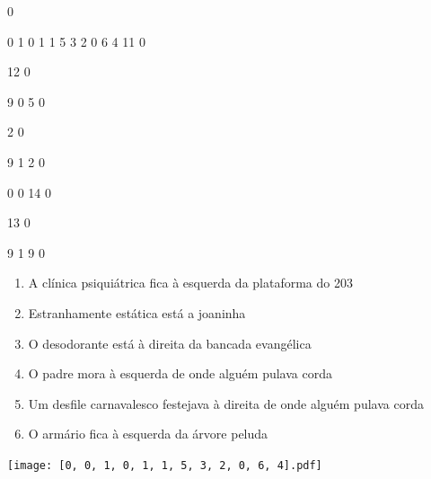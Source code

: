\documentclass[12pt]{article}
\begin{document}
		\vfill  
		  
{
	0	%

	0	%
	1	%
	0	%
	1	%
	1	%
	5	%
	3	%
	2	%
	0	%
	6	%
	4	%
	11	%
	0	%

	12	%
	0	%

	9	%
	0	%
	5	%
	0	%

	2	%
	0	%

	9	%
	1	%
	2	%
	0	%

	0	%
	0	%
	14	%
	0	%

	13	%
	0	%

	9	%
	1	%
	9	%
	0	%
}	  
		    	

		 

\pagebreak


	\begin{enumerate}
		  \sffamily %
		  \large %


\vfill \item
A clínica psiquiátrica fica	%
à esquerda
da plataforma do 203	%

\vfill \item
Estranhamente estática está	%
a joaninha	%

\vfill \item
O desodorante está	%
à direita
da bancada evangélica	%

\vfill \item
O padre mora	%
à esquerda
de onde alguém pulava corda	%

\vfill \item
Um desfile carnavalesco festejava	%
à direita
de onde alguém pulava corda	%

\vfill \item
O armário fica	%
à esquerda
da árvore peluda	%
	\end{enumerate}
		  
		  \hfill

		  \vfill

\texttt{[image: [0, 0, 1, 0, 1, 1, 5, 3, 2, 0, 6, 4].pdf]}


	\hfill	  	  

\end{document}

